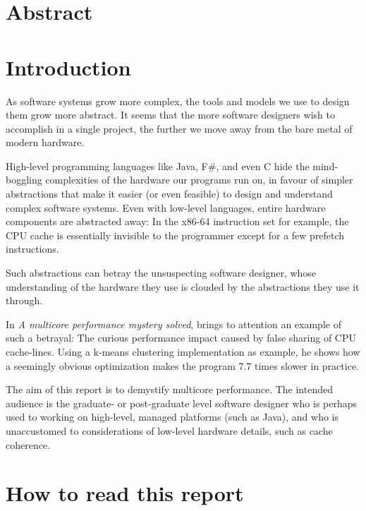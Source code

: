 \chapter{Abstract}

\chapter{Introduction}
As software systems grow more complex, the tools and models we use to design
them grow more abstract. It seems that the more software designers wish to
accomplish in a single project, the further we move away from the bare metal of
modern hardware.

High-level programming languages like Java, F\#, and even C hide the
mind-boggling complexities of the hardware our programs run on, in favour of
simpler abstractions that make it easier (or even feasible) to design and
understand complex software systems. Even with low-level languages, entire
hardware components are abstracted away: In the x86-64 instruction set for
example, the CPU cache is essentially invisible to the programmer except for a
few prefetch instructions.

Such abstractions can betray the unsuspecting software designer, whose
understanding of the hardware they use is clouded by the abstractions they use
it through.

In \textit{A multicore performance mystery solved}\cite{mystery},
\citeauthor{mystery} brings to attention an example of such a betrayal: The
curious performance impact caused by false sharing of CPU cache-lines. Using a
k-means clustering implementation as example, he shows how a seemingly obvious
optimization makes the program 7.7 times slower in practice.

The aim of this report is to demystify multicore performance.
The intended audience is the graduate- or post-graduate level software designer
who is perhaps used to working on high-level, managed platforms (such as Java),
and who is unaccustomed to considerations of low-level hardware details, such as
cache coherence.


\chapter{How to read this report}
